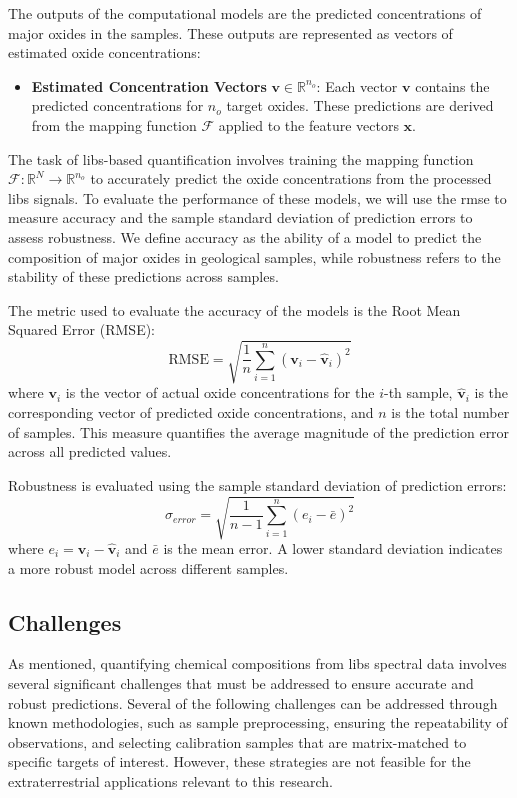 The outputs of the computational models are the predicted concentrations of major oxides in the samples.
These outputs are represented as vectors of estimated oxide concentrations:

\begin{itemize}
    \item \textbf{Estimated Concentration Vectors} $\mathbf{v} \in \mathbb{R}^{n_o}$: Each vector $\mathbf{v}$ contains the predicted concentrations for $n_o$ target oxides. These predictions are derived from the mapping function $\mathcal{F}$ applied to the feature vectors $\mathbf{x}$.
\end{itemize}

The task of \gls{libs}-based quantification involves training the mapping function $\mathcal{F}: \mathbb{R}^N \rightarrow \mathbb{R}^{n_o}$ to accurately predict the oxide concentrations from the processed \gls{libs} signals.
To evaluate the performance of these models, we will use the \gls{rmse} to measure accuracy and the sample standard deviation of prediction errors to assess robustness.
We define accuracy as the ability of a model to predict the composition of major oxides in geological samples, while robustness refers to the stability of these predictions across samples.

The metric used to evaluate the accuracy of the models is the Root Mean Squared Error (RMSE):
\[
\text{RMSE} = \sqrt{\frac{1}{n} \sum_{i=1}^{n} (\mathbf{v}_i - \hat{\mathbf{v}}_i)^2}
\]
where \( \mathbf{v}_i \) is the vector of actual oxide concentrations for the \( i \)-th sample, \( \hat{\mathbf{v}}_i \) is the corresponding vector of predicted oxide concentrations, and \( n \) is the total number of samples. This measure quantifies the average magnitude of the prediction error across all predicted values.

Robustness is evaluated using the sample standard deviation of prediction errors:
\[
\sigma_{error} = \sqrt{\frac{1}{n-1} \sum_{i=1}^{n} (e_i - \bar{e})^2}
\]
where \( e_i = \mathbf{v}_i - \hat{\mathbf{v}}_i \) and \( \bar{e} \) is the mean error.
A lower standard deviation indicates a more robust model across different samples.

\subsection{Challenges}
As mentioned, quantifying chemical compositions from \gls{libs} spectral data involves several significant challenges that must be addressed to ensure accurate and robust predictions.
Several of the following challenges can be addressed through known methodologies, such as sample preprocessing, ensuring the repeatability of observations, and selecting calibration samples that are matrix-matched to specific targets of interest\cite{andersonPostlandingMajorElement2022}.
However, these strategies are not feasible for the extraterrestrial applications relevant to this research.

